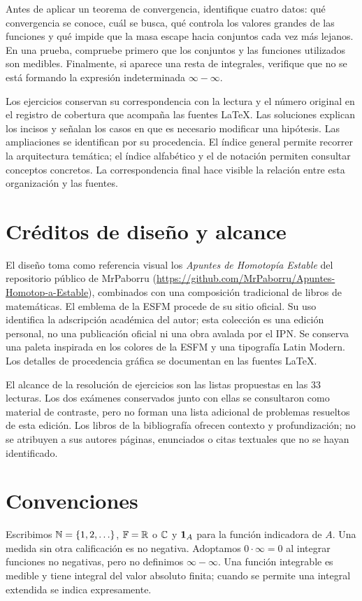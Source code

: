 Antes de aplicar un teorema de convergencia, identifique cuatro datos: qué convergencia se conoce, cuál se busca, qué controla los valores grandes de las funciones y qué impide que la masa escape hacia conjuntos cada vez más lejanos. En una prueba, compruebe primero que los conjuntos y las funciones utilizados son medibles. Finalmente, si aparece una resta de integrales, verifique que no se está formando la expresión indeterminada $\infty-\infty$.

Los ejercicios conservan su correspondencia con la lectura y el número original en el registro de cobertura que acompaña las fuentes LaTeX. Las soluciones explican los incisos y señalan los casos en que es necesario modificar una hipótesis. Las ampliaciones se identifican por su procedencia. El índice general permite recorrer la arquitectura temática; el índice alfabético y el de notación permiten consultar conceptos concretos. La correspondencia final hace visible la relación entre esta organización y las fuentes.

\section*{Créditos de diseño y alcance}
El diseño toma como referencia visual los \emph{Apuntes de Homotopía Estable} del repositorio público de MrPaborru (\url{https://github.com/MrPaborru/Apuntes-Homotop-a-Estable}), combinados con una composición tradicional de libros de matemáticas. El emblema de la ESFM procede de su sitio oficial. Su uso identifica la adscripción académica del autor; esta colección es una edición personal, no una publicación oficial ni una obra avalada por el IPN. Se conserva una paleta inspirada en los colores de la ESFM y una tipografía Latin Modern. Los detalles de procedencia gráfica se documentan en las fuentes LaTeX.

El alcance de la resolución de ejercicios son las listas propuestas en las 33 lecturas. Los dos exámenes conservados junto con ellas se consultaron como material de contraste, pero no forman una lista adicional de problemas resueltos de esta edición. Los libros de la bibliografía ofrecen contexto y profundización; no se atribuyen a sus autores páginas, enunciados o citas textuales que no se hayan identificado.

\section*{Convenciones}
Escribimos $\mathbb N=\{1,2,\ldots\}$, $\mathbb F=\mathbb R$ o $\mathbb C$ y $\mathbf1_{A}$ para la función indicadora de $A$. Una medida sin otra calificación es no negativa. Adoptamos $0\cdot\infty=0$ al integrar funciones no negativas, pero no definimos $\infty-\infty$. Una función integrable es medible y tiene integral del valor absoluto finita; cuando se permite una integral extendida se indica expresamente.

